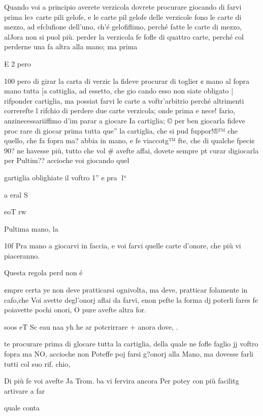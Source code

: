 \documentclass[12pt,a6paper]{article}
\begin{document}
Quando voi a principio averete verzicola dovrete procurare giocando di farvi prima le»
carte pili gelofe, e le carte pil
gelofe delle verzicole fono le
carte di mezzo, ad efclufione
dell’uno, ch’é gelofiflimo, perché fatte le carte di mezzo, alJora non si puol più. perder la
verzicola fe fofle di quattro carte, perché col perderne una
fa altra alla mano; ma prima

E 2 pero

 

 
 

 

 

 

100
pero di girar la carta di verzic
la fideve procurar di toglier ¢
mano al fopra mano tutta [a
cattiglia, ad essetto, che gio
cando esso non siate obligato |
rifponder cartiglia, ma possiat
farvi le carte a voftr’arbitrio
perché altrimenti correrefte l
rifchio di perdere due carte
verzicola; onde prima e nece!
fario, anzinecessariiffimo d’im
parar a giocare Ia cartiglia; ©
per ben giocarla fideve proc
rare di giocar prima tutta que”
la cartiglia, che si pud fuppor!®™
che quello, che fa fopra ma?
abbia in mano, e fe viaccotg™
fte, che di qualche fpeci¢ 90?
ne havesse più, tutto che vol #
avefte affai, dovete sempre pt
curar digiocarla per Pultim??
accioche voi giocando quel

gartiglia oblighiate il voftro 1”
e pra
l“

a eral S

eoT rw

Pultima mano, la

10f
Pra mano a giocarvi in faccia,
e voi farvi quelle carte d’onore,
che più vi piaceranno.

Questa regola perd non é

¢mpre certa ye non deve pratticarsi ognivolta, ma deve,
pratticar folamente in cafo,che
Voi avette degl’onorj aflai da
farvi, enon pefte la forma dj
poterli fares fe poiavette pochi
onori, O pure avefte altra for.

soos eT Sc eau naa yh
he ar potcrirrare + anora dove, .

te procurare prima di glocare
tutta la cartiglia, della quale ne
fofle faglio jj voftro fopra ma
NO, accioche non Poteffe poj
farsi g?onorj alla Mano, ma dovesse farli tutti col suo rif.
chio,

Di più fe voi avefte Ja Trom.
ba vi fervira ancora Per potey
con più facilitg artivare a far

quale conta
\end{document}
